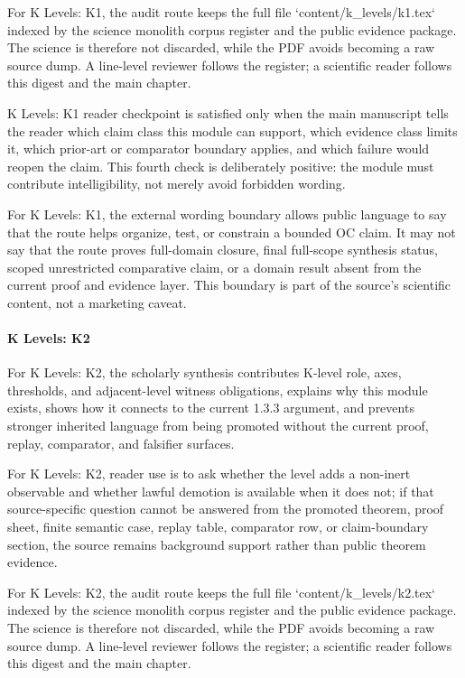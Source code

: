 For K Levels: K1, the audit route keeps the full file `content/k\_levels/k1.tex` indexed by the science monolith corpus register and the public evidence package. The science is therefore not discarded, while the PDF avoids becoming a raw source dump. A line-level reviewer follows the register; a scientific reader follows this digest and the main chapter.


K Levels: K1 reader checkpoint is satisfied only when the main manuscript tells the reader which claim class this module can support, which evidence class limits it, which prior-art or comparator boundary applies, and which failure would reopen the claim. This fourth check is deliberately positive: the module must contribute intelligibility, not merely avoid forbidden wording.


For K Levels: K1, the external wording boundary allows public language to say that the route helps organize, test, or constrain a bounded OC claim. It may not say that the route proves full-domain closure, final full-scope synthesis status, scoped unrestricted comparative claim, or a domain result absent from the current proof and evidence layer. This boundary is part of the source's scientific content, not a marketing caveat.


\paragraph{K Levels: K2}

For K Levels: K2, the scholarly synthesis contributes K-level role, axes, thresholds, and adjacent-level witness obligations, explains why this module exists, shows how it connects to the current 1.3.3 argument, and prevents stronger inherited language from being promoted without the current proof, replay, comparator, and falsifier surfaces.


For K Levels: K2, reader use is to ask whether the level adds a non-inert observable and whether lawful demotion is available when it does not; if that source-specific question cannot be answered from the promoted theorem, proof sheet, finite semantic case, replay table, comparator row, or claim-boundary section, the source remains background support rather than public theorem evidence.


For K Levels: K2, the audit route keeps the full file `content/k\_levels/k2.tex` indexed by the science monolith corpus register and the public evidence package. The science is therefore not discarded, while the PDF avoids becoming a raw source dump. A line-level reviewer follows the register; a scientific reader follows this digest and the main chapter.


